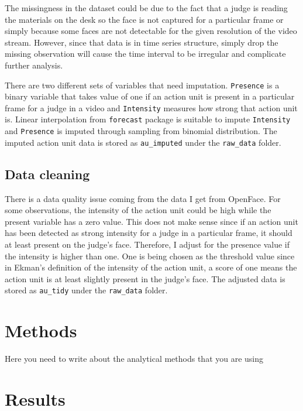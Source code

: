 \documentclass{monashthesis}
\begin{document}
The missingness in the dataset could be due to the fact that a judge is reading the materials on the desk so the face is not captured for a particular frame or simply because some faces are not detectable for the given resolution of the video stream. However, since that data is in time series structure, simply drop the missing observation will cause the time interval to be irregular and complicate further analysis.

There are two different sets of variables that need imputation. \texttt{Presence} is a binary variable that takes value of one if an action unit is present in a particular frame for a judge in a video and \texttt{Intensity} measures how strong that action unit is. Linear interpolation from \texttt{forecast} package is suitable to impute \texttt{Intensity} and \texttt{Presence} is imputed through sampling from binomial distribution. The imputed action unit data is stored as \texttt{au\_imputed} under the \texttt{raw\_data} folder.

\hypertarget{data-cleaning}{%
\section{Data cleaning}\label{data-cleaning}}

There is a data quality issue coming from the data I get from OpenFace. For some observations, the intensity of the action unit could be high while the present variable has a zero value. This does not make sense since if an action unit has been detected as strong intensity for a judge in a particular frame, it should at least present on the judge's face. Therefore, I adjust for the presence value if the intensity is higher than one. One is being chosen as the threshold value since in Ekman's definition of the intensity of the action unit, a score of one means the action unit is at least slightly present in the judge's face. The adjusted data is stored as \texttt{au\_tidy} under the \texttt{raw\_data} folder.

\hypertarget{methods}{%
\chapter{Methods}\label{methods}}

Here you need to write about the analytical methods that you are using

\hypertarget{results}{%
\chapter{Results}\label{results}}
\end{document}
